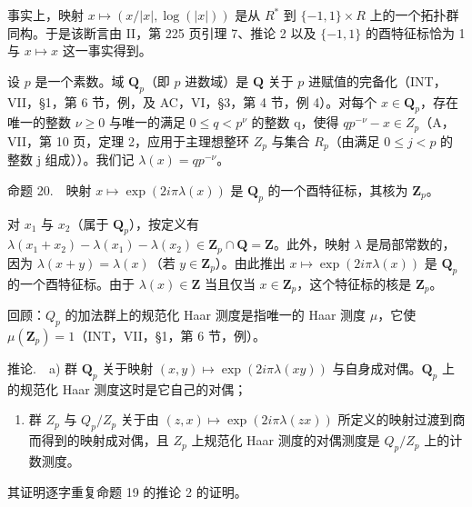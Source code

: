 事实上，映射 \(x \mapsto (x/|x|, \log(|x|))\) 是从 \(R^{*}\) 到 \(\{-1, 1\} \times R\) 上的一个拓扑群同构。于是该断言由 II，第 225 页引理 7、推论 2 以及 \(\{-1, 1\}\) 的酉特征标恰为 1 与 \(x \mapsto x\) 这一事实得到。

设 \(p\) 是一个素数。域 \(\mathbf{Q}_{p}\)（即 \(p\) 进数域）是 \(\mathbf{Q}\) 关于 \(p\) 进赋值的完备化（INT，VII，§1，第 6 节，例，及 AC，VI，§3，第 4 节，例 4）。对每个 \(x \in \mathbf{Q}_{p}\)，存在唯一的整数 \(\nu\geqslant0\) 与唯一的满足 \(0\leqslant q<p^{\nu}\) 的整数 q，使得 \(qp^{-\nu}-x\in Z_{p}\)（A，VII，第 10 页，定理 2，应用于主理想整环 \(Z_{p}\) 与集合 \(R_{p}\)（由满足 \(0\leqslant j<p\) 的整数 j 组成））。我们记 \(\lambda(x)=qp^{-\nu}\)。

命题 20.　映射 \(x \mapsto \exp(2i\pi\lambda(x))\) 是 \(\mathbf{Q}_{p}\) 的一个酉特征标，其核为 \(\mathbf{Z}_{p}\)。

对 \(x_1\) 与 \(x_2\)（属于 \(\mathbf{Q}_p\)），按定义有 \(\lambda(x_1 + x_2) - \lambda(x_1) - \lambda(x_2) \in \mathbf{Z}_p \cap \mathbf{Q} = \mathbf{Z}\)。此外，映射 \(\lambda\) 是局部常数的，因为 \(\lambda(x + y) = \lambda(x)\)（若 \(y \in \mathbf{Z}_p\)）。由此推出 \(x \mapsto \exp(2i\pi\lambda(x))\) 是 \(\mathbf{Q}_p\) 的一个酉特征标。由于 \(\lambda(x) \in \mathbf{Z}\) 当且仅当 \(x \in \mathbf{Z}_p\)，这个特征标的核是 \(\mathbf{Z}_p\)。

回顾：\(Q_{p}\) 的加法群上的规范化 Haar 测度是指唯一的 Haar 测度 \(\mu\)，它使 \(\mu(\mathbf{Z}_{p}) = 1\)（INT，VII，§1，第 6 节，例）。

推论.　a) 群 \(\mathbf{Q}_{p}\) 关于映射 \((x,y)\mapsto\exp(2i\pi\lambda(xy))\) 与自身成对偶。\(\mathbf{Q}_{p}\) 上的规范化 Haar 测度这时是它自己的对偶；

\begin{enumerate}
\def\labelenumi{\alph{enumi})}
\setcounter{enumi}{1}
\tightlist
\item
  群 \(Z_{p}\) 与 \(Q_{p}/Z_{p}\) 关于由 \((z,x)\mapsto\exp(2i\pi\lambda(zx))\) 所定义的映射过渡到商而得到的映射成对偶，且 \(Z_{p}\) 上规范化 Haar 测度的对偶测度是 \(Q_{p}/Z_{p}\) 上的计数测度。
\end{enumerate}

其证明逐字重复命题 19 的推论 2 的证明。

